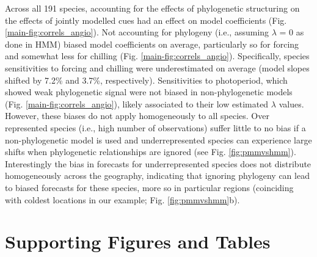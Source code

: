 \documentclass[11pt]{article}
\begin{document}
Across all 191 species, accounting for the effects of phylogenetic structuring on the effects of jointly modelled cues had an effect on model coefficients (Fig. \ref{main-fig:correls_angio}). Not accounting for phylogeny (i.e., assuming $\lambda$ = 0 as done in HMM) biased model coefficients on average, particularly so for forcing and somewhat less for chilling (Fig. \ref{main-fig:correls_angio}). Specifically, species sensitivities to forcing and chilling were underestimated on average (model slopes shifted by 7.2\% and 3.7\%, respectively). Sensitivities to photoperiod, which showed weak phylogenetic signal were not biased in non-phylogenetic models (Fig. \ref{main-fig:correls_angio}), likely associated to their low estimated $\lambda$ values. However, these biases do not apply homogeneously to all species. Over represented species (i.e., high number of observations) suffer little to no bias if a non-phylogenetic model is used and underrepresented species can experience large shifts when phylogenetic relationships are ignored (see Fig. \ref{fig:pmmvshmm}). Interestingly the bias in forecasts for underrepresented species does not distribute homogeneously across the geography, indicating that ignoring phylogeny can lead to biased forecasts for these species, more so in particular regions (coinciding with coldest locations in our example; Fig. \ref{fig:pmmvshmm}b).\\ 

\clearpage







\clearpage
\section*{Supporting Figures and Tables}
\end{document}
